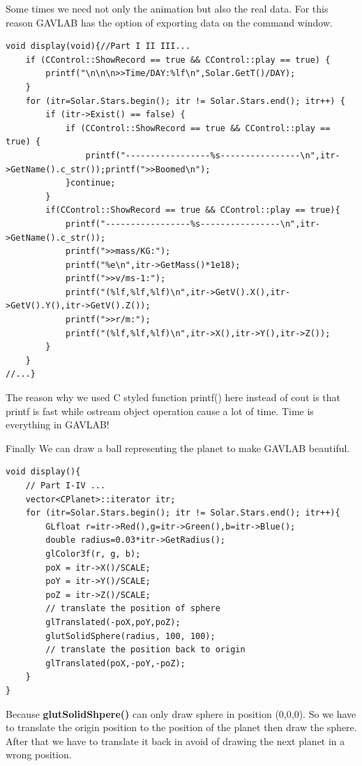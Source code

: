 \documentclass[12pt]{article}
\begin{document}
Some times we need not only the animation but also the real data.
For this reason GAVLAB has the option of exporting data on the command window.
\begin{lstlisting}[caption=display() PartIV exporting data]
void display(void){//Part I II III...
    if (CControl::ShowRecord == true && CControl::play == true) {
        printf("\n\n\n>>Time/DAY:%lf\n",Solar.GetT()/DAY);
    }
    for (itr=Solar.Stars.begin(); itr != Solar.Stars.end(); itr++) {
        if (itr->Exist() == false) {
            if (CControl::ShowRecord == true && CControl::play == true) {
                printf("-----------------%s----------------\n",itr->GetName().c_str());printf(">>Boomed\n");
            }continue;  
        }
        if(CControl::ShowRecord == true && CControl::play == true){
            printf("-----------------%s----------------\n",itr->GetName().c_str());
            printf(">>mass/KG:");
            printf("%e\n",itr->GetMass()*1e18);
            printf(">>v/ms-1:");
            printf("(%lf,%lf,%lf)\n",itr->GetV().X(),itr->GetV().Y(),itr->GetV().Z());
            printf(">>r/m:");
            printf("(%lf,%lf,%lf)\n",itr->X(),itr->Y(),itr->Z());
        }
    }
//...}
\end{lstlisting} 
The reason why we used C styled function printf() here instead of cout is that printf is fast while
ostream object operation cause a lot of time.
Time is everything in GAVLAB!

Finally We can draw a ball representing the planet to make GAVLAB beautiful.
\begin{lstlisting}[caption=display() Part V drawing planets]
void display(){
    // Part I-IV ...
    vector<CPlanet>::iterator itr;
    for (itr=Solar.Stars.begin(); itr != Solar.Stars.end(); itr++){
        GLfloat r=itr->Red(),g=itr->Green(),b=itr->Blue();
        double radius=0.03*itr->GetRadius();
        glColor3f(r, g, b);
        poX = itr->X()/SCALE;
        poY = itr->Y()/SCALE;
        poZ = itr->Z()/SCALE;
        // translate the position of sphere
        glTranslated(-poX,poY,poZ);
        glutSolidSphere(radius, 100, 100);
        // translate the position back to origin
        glTranslated(poX,-poY,-poZ);
    }
}
\end{lstlisting}

Because \textbf{glutSolidShpere()} can only draw sphere in position (0,0,0).
So we have to translate the origin position to the position of the planet then draw the sphere.
After that we have to translate it back in avoid of drawing the next planet in a wrong position.
\end{document}

